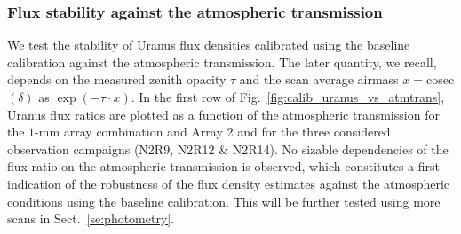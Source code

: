 \subsubsection{Flux stability against the atmospheric transmission}
\label{se:baseline_calibration_atm}

We test the stability of Uranus flux densities calibrated using the
baseline calibration against the atmospheric transmission. The later
quantity, we
recall, depends on the measured zenith opacity $\tau$ and the scan
average airmass $x = $cosec$(\delta)$ as $\exp{(-\tau \cdot x)}$. In
the first row of Fig.~\ref{fig:calib_uranus_vs_atmtrans}, Uranus flux ratios
are plotted as a function of the atmospheric
transmission for the $1$-mm array combination and Array 2 and for the
three considered observation campaigns (N2R9, N2R12 $\&$ N2R14). No
sizable dependencies of the flux ratio on the atmospheric transmission
is observed, which constitutes a first
indication of the robustness of the flux density estimates against the
atmospheric conditions using the baseline calibration. This will be
further tested using more scans in Sect.~\ref{se:photometry}.
%
